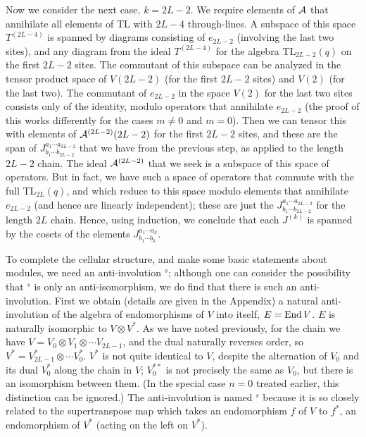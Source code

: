 \documentclass[twocolumn,floats,pra]{revtex4}
\def \cA {{\cal A}}
\begin{document}
Now we consider the next case, $k=2L-2$. We require elements of
$\cA$ that annihilate all elements of TL with $2L-4$
through-lines. A subspace of this space $T^{(2L-4)}$ is spanned by
diagrams consisting of $e_{2L-2}$ (involving the last two sites),
and any diagram from the ideal $T^{(2L-4)}$ for the algebra
TL$_{2L-2}(q)$ on the first $2L-2$ sites. The commutant of this
subspace can be analyzed in the tensor product space of $V(2L-2)$
(for the first $2L-2$ sites) and $V(2)$ (for the last two). The
commutant of $e_{2L-2}$ in the space $V(2)$ for the last two sites
consists only of the identity, modulo operators that annihilate
$e_{2L-2}$ (the proof of this works differently for the cases
$m\neq0$ and $m=0$). Then we can tensor this with elements of
$\cA^{(2L-2)}(2L-2)$ for the first $2L-2$ sites, and these are the
span of $J^{a_1\cdots a_{2L-2}}_{b_1\cdots b_{2L-2}}$ that we have
from the previous step, as applied to the length $2L-2$ chain. The
ideal $\cA^{(2L-2)}$ that we seek is a subspace of this space of
operators. But in fact, we have such a space of operators that
commute with the full TL$_{2L}(q)$, and which reduce to this space
modulo elements that annihilate $e_{2L-2}$ (and hence are linearly
independent); these are just the $J^{a_1\cdots
a_{2L-2}}_{b_1\cdots b_{2L-2}}$ for the length $2L$ chain. Hence,
using induction, we conclude that each $J^{(k)}$ is spanned by the
cosets of the elements $J^{a_1\cdots a_k}_{b_1\cdots b_k}$.

To complete the cellular structure, and make some basic statements
about modules, we need an anti-involution $^s$; although one can
consider the possibility that $^s$ is only an anti-isomorphism, we
do find that there is such an anti-involution. First we obtain
(details are given in the Appendix) a natural anti-involution of
the algebra of endomorphisms of $V$ into itself, $E={\rm End}\,
V$. $E$ is naturally isomorphic to $V\otimes V^*$. As we have
noted previously, for the chain we have $V=V_0\otimes V_1\otimes
\cdots V_{2L-1}$, and the dual naturally reverses order, so
$V^*=V_{2L-1}^*\otimes\cdots V_0^*$. $V^*$ is not quite identical
to $V$, despite the alternation of $V_0$ and its dual $V_0^*$
along the chain in $V$; $V_0^{**}$ is not precisely the same as
$V_0$, but there is an isomorphism between them. (In the special
case $n=0$ treated earlier, this distinction can be ignored.) The
anti-involution is named $^s$ because it is so closely related to
the supertranspose map which takes an endomorphism $f$ of $V$ to
$f^*$, an endomorphism of $V^*$ (acting on the left on $V^*$).
\end{document}

